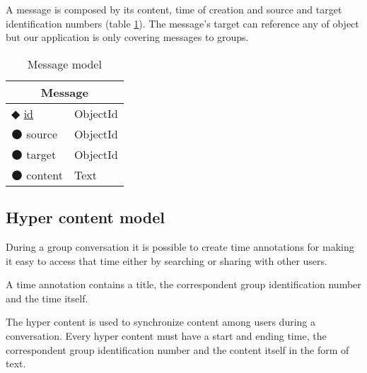 A message is composed by its content, time of creation and source and target identification numbers (table \ref{table:message}). The message's target can reference any of object but our application is only covering messages to groups.

\begin{table}[!htb]
\centering
\caption{Message model}
\label{table:message}
    \begin{tabular}{|ll|}
        \hline
        \multicolumn{2}{|c|}{\textbf{Message}}                             \\ \hline
        $\Diamondblack$ \underline{id}  & ObjectId                      \\ 
        $\medbullet$ source           & ObjectId                         \\ 
        $\medbullet$ target      & ObjectId                         \\ 
        $\medbullet$ content      & Text                         \\ \hline
    \end{tabular}
\end{table}

\subsection{Hyper content model}

During a group conversation it is possible to create time annotations for making it easy to access that time either by searching or sharing with other users.

A time annotation contains a title, the correspondent group identification number and the time itself.

The hyper content is used to synchronize content among users during a conversation. Every hyper content must have a start and ending time, the correspondent group identification number and the content itself in the form of text.


